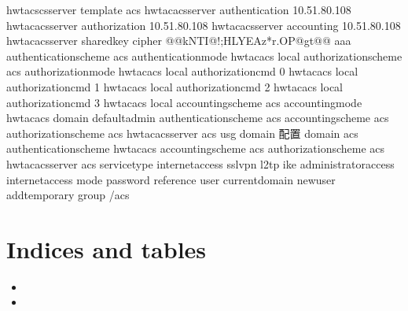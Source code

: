 \documentclass[a4paper,10pt,english]{sphinxmanual}
\begin{document}
\begin{itemize}
\begin{sphinxVerbatim}[commandchars=\\\{\}]
hwtacscs\PYGZhy{}server template acs
hwtacacs\PYGZhy{}server authentication 10.51.80.108
hwtacacs\PYGZhy{}server authorization 10.51.80.108
hwtacacs\PYGZhy{}server accounting 10.51.80.108
hwtacacs\PYGZhy{}server shared\PYGZhy{}key cipher \PYGZpc{}@\PYGZpc{}@\PYGZdl{}\PYGZcb{}kNTI\PYGZdq{}@!;HLYEAz*r.OP@gt\PYGZpc{}@\PYGZpc{}@
aaa
authentication\PYGZhy{}scheme acs
  authentication\PYGZhy{}mode hwtacacs local
authorization\PYGZhy{}scheme acs
  authorization\PYGZhy{}mode hwtacacs local
  authorization\PYGZhy{}cmd 0 hwtacacs local
  authorization\PYGZhy{}cmd 1 hwtacacs local
  authorization\PYGZhy{}cmd 2 hwtacacs local
  authorization\PYGZhy{}cmd 3 hwtacacs local
accounting\PYGZhy{}scheme acs
  accounting\PYGZhy{}mode hwtacacs
domain default\PYGZus{}admin
  authentication\PYGZhy{}scheme acs
  accounting\PYGZhy{}scheme acs
  authorization\PYGZhy{}scheme acs
  hwtacacs\PYGZhy{}server acs
\PYGZsh{} usg domain 配置
domain acs
  authentication\PYGZhy{}scheme hwtacacs
  accounting\PYGZhy{}scheme acs
  authorization\PYGZhy{}scheme acs
  hwtacacs\PYGZhy{}server acs
  service\PYGZhy{}type internetaccess ssl\PYGZhy{}vpn l2tp ike administrator\PYGZhy{}access
  internet\PYGZhy{}access mode password
  reference user current\PYGZhy{}domain
  new\PYGZhy{}user add\PYGZhy{}temporary group /acs
\end{sphinxVerbatim}

\end{itemize}


\chapter{Indices and tables}
\label{\detokenize{index:indices-and-tables}}\begin{itemize}
\item {} 

\item {} 

\end{itemize}



\renewcommand{\indexname}{Index}
\printindex
\end{document}
